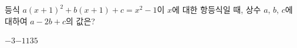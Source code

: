 등식 $a(x+1)^2+b(x+1)+c=x^2-1$이 $x$에 대한 항등식일 때, 상수 $a$, $b$, $c$에 대하여 $a-2b+c$의 값은?
\begin{choices32}{$-3$}{$-1$}{$1$}{$3$}{$5$}\end{choices32}
